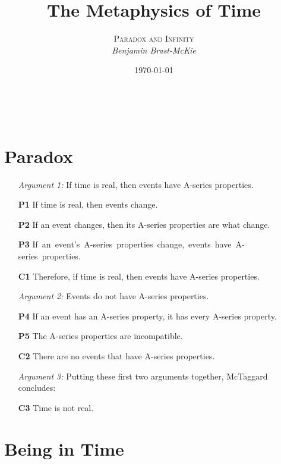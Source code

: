 \documentclass[a4paper, 11pt]{article} %
\title{\textbf{The Metaphysics of Time}} %
\author{\textsc{Paradox and Infinity}\\ \em Benjamin Brast-McKie} %
\date{\today} %
\makeatletter
\renewcommand{\maketitle}{ %
\begin{flushright} %
{\LARGE\@title} %

\vspace{10pt} %

{\@author} %
\\\@date %

\vspace{-20pt} %
\end{flushright}
}
\makeatother
\begin{document}
\maketitle %

\thispagestyle{empty}


\section*{Paradox}

\begin{itemize}
  \item[\it Argument 1:] If time is real, then events have A-series properties.
    \item[\bf P1] If time is real, then events change.
    \item[\bf P2] If an event changes, then its A-series properties are what change.
    \item[\bf P3] \mbox{If an event's A-series properties change, events have A-series properties.}
    \item[\bf C1] Therefore, if time is real, then events have A-series properties.
  \item[\it Argument 2:] Events do not have A-series properties.
    \item[\bf P4] If an event has an A-series property, it has every A-series property.
    \item[\bf P5] The A-series properties are incompatible.
    \item[\bf C2] There are no events that have A-series properties. 
  \item[\it Argument 3:] Putting these first two arguments together, McTaggard concludes:
    \item[\bf C3] Time is not real.
\end{itemize}





\section*{Being in Time}
\end{document}
